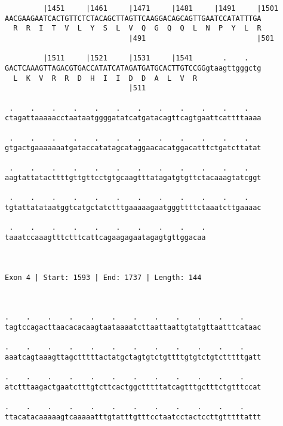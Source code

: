 \documentclass{article}
\begin{document}
\begin{Verbatim}
         |1451     |1461     |1471     |1481     |1491     |1501
AACGAAGAATCACTGTTCTCTACAGCTTAGTTCAAGGACAGCAGTTGAATCCATATTTGA
  R  R  I  T  V  L  Y  S  L  V  Q  G  Q  Q  L  N  P  Y  L  R
                             |491                          |501
  
         |1511     |1521     |1531     |1541       .    .   
GACTCAAAGTTAGACGTGACCATATCATAGATGATGCACTTGTCCGGgtaagttgggctg
  L  K  V  R  R  D  H  I  I  D  D  A  L  V  R               
                             |511                           
  
 .    .    .    .    .    .    .    .    .    .    .    .   
ctagattaaaaacctaataatggggatatcatgatacagttcagtgaattcattttaaaa
                                                            
 .    .    .    .    .    .    .    .    .    .    .    .   
gtgactgaaaaaaatgataccatatagcataggaacacatggacatttctgatcttatat
                                                            
 .    .    .    .    .    .    .    .    .    .    .    .   
aagtattatacttttgttgttcctgtgcaagtttatagatgtgttctacaaagtatcggt
                                                            
 .    .    .    .    .    .    .    .    .    .    .    .   
tgtattatataatggtcatgctatctttgaaaaagaatgggttttctaaatcttgaaaac
                                                            
 .    .    .    .    .    .    .    .    .    .
taaatccaaagtttctttcattcagaagagaatagagtgttggacaa
                                               
                                               
 
Exon 4 | Start: 1593 | End: 1737 | Length: 144



.    .    .    .    .    .    .    .    .    .    .    .    
tagtccagacttaacacacaagtaataaaatcttaattaattgtatgttaatttcataac
                                                            
.    .    .    .    .    .    .    .    .    .    .    .    
aaatcagtaaagttagctttttactatgctagtgtctgttttgtgtctgtctttttgatt
                                                            
.    .    .    .    .    .    .    .    .    .    .    .    
atctttaagactgaatctttgtcttcactggctttttatcagtttgctttctgtttccat
                                                            
.    .    .    .    .    .    .    .    .    .    .    .    
ttacatacaaaaagtcaaaaatttgtatttgtttcctaatcctactccttgtttttattt
                                                            

\end{Verbatim}
\end{document}
